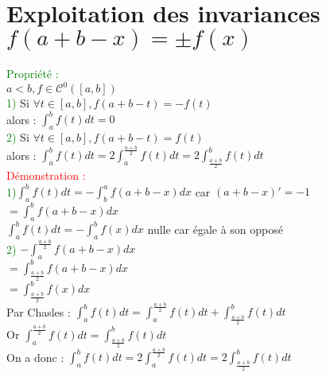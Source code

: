 \documentclass{article}
\begin{document}
	\section{Exploitation des invariances $f(a+b-x)=\pm f(x)$}
	\textcolor{green}{Propriété :} \\ 
	$a<b, f \in \mathcal{C}^0([a,b])$ \\ 
	\textcolor{green}{1)} Si $\forall t \in [a,b], f(a+b-t)=-f(t)$ \\ 
	alors : $\int_a^bf(t)dt=0$ \\ 
	\textcolor{green}{2)} Si $\forall t \in [a,b], f(a+b-t)=f(t)$ \\ 
	alors : $\int_a^bf(t)dt=2\int_a^{\frac{a+b}{2}}f(t)dt=2\int^b_{\frac{a+b}{2}}f(t)dt$ \\ 
	\textcolor{red}{Démonstration :} \\ 
	\textcolor{green}{1)}$\int_a^bf(t)dt=-\int_b^af(a+b-x)dx$ car $(a+b-x)'=-1$ \\ 
	$=\int_a^bf(a+b-x)dx$ \\ 
	$\int_a^bf(t)dt=-\int_a^bf(x)dx$ nulle car égale à son opposé \\ 
	\textcolor{green}{2)} $-\int_a^{\frac{a+b}{2}}f(a+b-x)dx$ \\ 
	$=\int_{\frac{a+b}{2}}^bf(a+b-x)dx$ \\ 
	$=\int_{\frac{a+b}{2}}^{b}f(x)dx$ \\ 
	Par Chasles : $\int_a^bf(t)dt=\int_a^{\frac{a+b}{2}}f(t)dt + \int_{\frac{a+b}{2}}^bf(t)dt$ \\ 
	Or $\int_a^{\frac{a+b}{2}}f(t)dt = \int_{\frac{a+b}{2}}^bf(t)dt$ \\ 
	On a donc : $\int_a^bf(t)dt=2\int_a^{\frac{a+b}{2}}f(t)dt=2\int^b_{\frac{a+b}{2}}f(t)dt$
\end{document}
